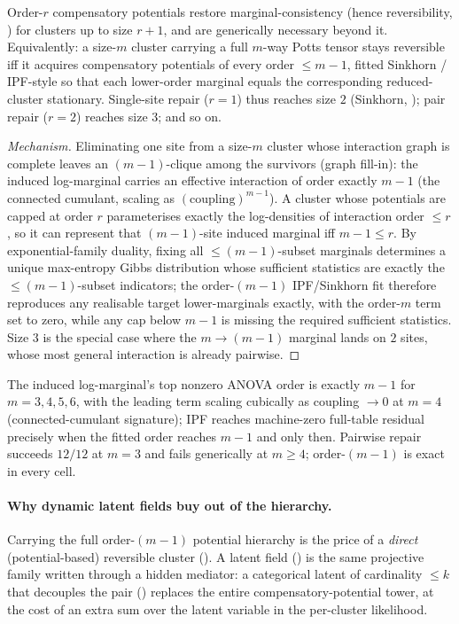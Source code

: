 \begin{proposition}
\label{prop:orderrule}
Order-$r$ compensatory potentials restore marginal-consistency
(hence reversibility, ) for clusters up to size
$r+1$, and are generically necessary beyond it. Equivalently: a
size-$m$ cluster carrying a full $m$-way Potts tensor stays
reversible iff it acquires compensatory potentials of every order
$\le m-1$, fitted Sinkhorn / IPF-style so that each lower-order
marginal equals the corresponding reduced-cluster stationary.
Single-site repair ($r=1$) thus reaches size $2$ (Sinkhorn,
); pair repair ($r=2$) reaches size $3$;
and so on.
\end{proposition}

\begin{proof}[Mechanism]
Eliminating one site from a size-$m$ cluster whose interaction
graph is complete leaves an $(m-1)$-clique among the survivors
(graph fill-in): the induced log-marginal carries an effective
interaction of order exactly $m-1$ (the connected cumulant, scaling
as $(\text{coupling})^{m-1}$). A cluster whose potentials are
capped at order $r$ parameterises exactly the log-densities of
interaction order $\le r$, so it can represent that $(m-1)$-site
induced marginal iff $m-1\le r$. By exponential-family duality,
fixing all $\le(m-1)$-subset marginals determines a unique
max-entropy Gibbs distribution whose sufficient statistics are
exactly the $\le(m-1)$-subset indicators; the order-$(m-1)$
IPF/Sinkhorn fit therefore reproduces any realisable target
lower-marginals exactly, with the order-$m$ term set to zero,
while any cap below $m-1$ is missing the required sufficient
statistics. Size $3$ is the special case where the
$m\!\to\!(m-1)$ marginal lands on $2$ sites, whose most general
interaction is already pairwise.
\end{proof}

The induced log-marginal's top nonzero ANOVA order is exactly
$m-1$ for $m=3,4,5,6$, with the leading term scaling cubically as
coupling $\to 0$ at $m=4$ (connected-cumulant signature); IPF
reaches machine-zero full-table residual precisely when the fitted
order reaches $m-1$ and only then. Pairwise repair succeeds
$12/12$ at $m=3$ and fails generically at $m\ge 4$; order-$(m-1)$
is exact in every cell.

\paragraph{Why dynamic latent fields buy out of the hierarchy.}
Carrying the full order-$(m-1)$ potential hierarchy is the price of
a \emph{direct} (potential-based) reversible cluster
(). A latent field
() is the same projective family written
through a hidden mediator: a categorical latent of cardinality
$\le k$ that decouples the pair () replaces
the entire compensatory-potential tower, at the cost of an extra
sum over the latent variable in the per-cluster likelihood.

